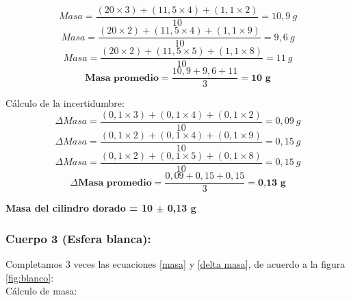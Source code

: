 \documentclass[10pt]{article}
\begin{document}
\begin{equation*} 
    Masa = \frac{(20\times3)+(11,5\times4)+(1,1\times2)}{10} = 10,9~g
\end{equation*}
\begin{equation*}
    Masa = \frac{(20\times2)+(11,5\times4)+(1,1\times9)}{10} = 9,6~g
\end{equation*}
\begin{equation*}
    Masa = \frac{(20\times2)+(11,5\times5)+(1,1\times8)}{10} = 11~g
\end{equation*}
\vspace{0.2cm}
\begin{equation*}
    \textbf{Masa~promedio}= \frac{10,9+9,6+11}{3} = \textbf{10~g}
\end{equation*}
\vspace{0.1cm}

Cálculo de la incertidumbre:
\begin{equation*}
     \Delta Masa =\frac{(0,1\times3)+(0,1\times4)+(0,1\times2)}{10} = 0,09~g
\end{equation*}
\begin{equation*}
     \Delta Masa =\frac{(0,1\times2)+(0,1\times4)+(0,1\times9)}{10} = 0,15~g
\end{equation*}
\begin{equation*}
     \Delta Masa =\frac{(0,1\times2)+(0,1\times5)+(0,1\times8)}{10} = 0,15~g
\end{equation*}
\vspace{0.2cm}
\begin{equation*}
    \Delta \textbf{Masa~promedio} = \frac{0,09+0,15+0,15}{3} = \textbf{0,13~g}
\end{equation*}

\vspace{0.3cm}
\begin{center}
    \textbf{Masa del cilindro dorado = 10 $\pm$ 0,13 g}
\end{center}
\vspace{0.1cm}

\subsubsection{Cuerpo 3 (Esfera blanca):}
\vspace{0,2cm}

Completamos 3 veces las ecuaciones \ref{masa} y \ref{delta masa}, de acuerdo a la figura \ref{fig:blanco}:\\

Cálculo de masa:
\end{document}
